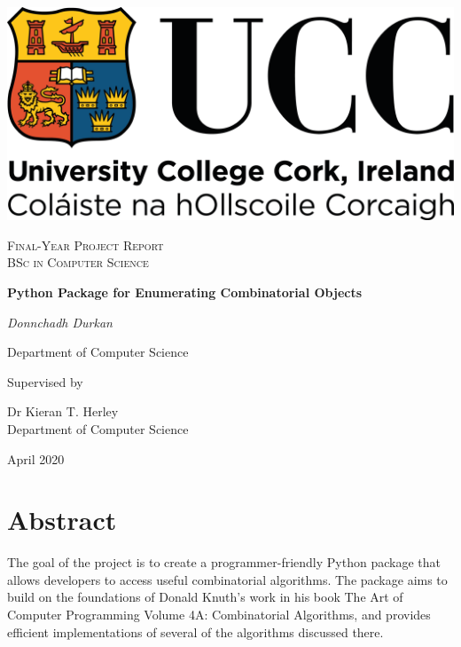 \documentclass[12pt]{article}
\begin{document}
\begin{titlepage}
    \thispagestyle{empty}
    \setlength\headheight{0pt} 
    \begin{center}

    \begin{center}
    \includegraphics[width=0.65\linewidth]{images/ucc_logo.png}            
    \end{center}	

        \vspace{0.25cm}
        \vspace{0.25cm}
        {\scshape\Large Final-Year Project Report \\ BSc in Computer Science\par}
        \vspace{0.5cm}

        {\Large\bfseries Python Package for Enumerating Combinatorial Objects\par}
        
        \vspace{0.5cm}
        {\Large\itshape Donnchadh Durkan\par}
        Department of Computer Science
        \vspace{0.25cm}

    \vspace{1cm}
    Supervised by\par
    Dr Kieran T. Herley \\
    Department of Computer Science\par
    \vspace{1.5cm}
    \large
    April 2020

    \end{center}
\end{titlepage}

\section*{Abstract}
\vspace*{7em}
The goal of the project is to create a programmer-friendly Python package
that allows developers to access useful combinatorial algorithms. The package aims to build on the
foundations of Donald Knuth’s work in his book The Art of Computer Programming Volume 4A:
Combinatorial Algorithms, and provides efficient implementations of several of the algorithms
discussed there.
\end{document}
